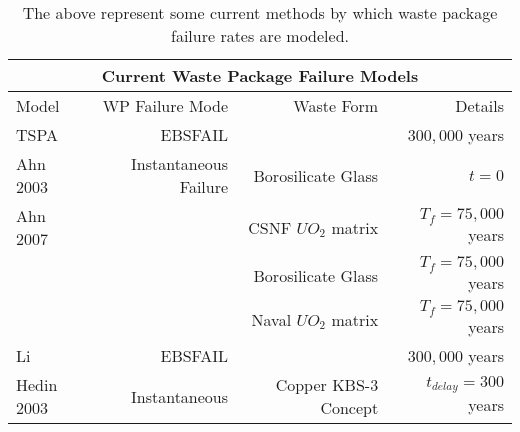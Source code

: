 \begin{table}[h!]
\centering
\footnotesize{
\begin{tabular}[h!bt]{|l|r|r|r|}
  \multicolumn{4}{c}{\textbf{Current Waste Package Failure Models}}\\
  \hline
  Model&WP Failure Mode&Waste Form&Details\\
  \hline
  TSPA&EBSFAIL&&$300,000$ years\\
  \hline
  Ahn 2003&Instantaneous Failure&Borosilicate Glass&$t=0$\\
  \hline
  Ahn 2007& &CSNF $UO_2$ matrix &$T_f=75,000$ years\\
  & &Borosilicate Glass &$T_f=75,000$ years\\
  & & Naval $UO_2$ matrix &$T_f=75,000$ years\\
  \hline
  Li&EBSFAIL&&$300,000$ years\\
  \hline
  Hedin 2003& Instantaneous & Copper KBS-3 Concept & $t_{delay} = 300$ years \\
  \hline
\end{tabular}
\label{tab:wpfail}
\caption[Current waste package failure models.]{The above represent some current methods by which 
waste package failure rates are modeled.}
}
\end{table}
